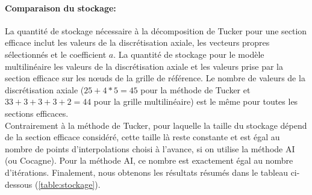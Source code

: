 \paragraph{Comparaison du stockage:\\}
\hspace{0.5cm} La quantité de stockage nécessaire à la décomposition de Tucker pour une section efficace inclut les valeurs de la discrétisation axiale, les vecteurs propres sélectionnés et le coefficient $a$. La quantité de stockage pour le modèle multilinéaire les valeurs de la discrétisation axiale et les valeurs prise par la section efficace sur les nœuds de la grille de référence. Le nombre de valeurs de la discrétisation axiale ($25+4*5=45$ pour la méthode de Tucker et $33+3+3+3+2=44$ pour la grille multilinéaire) est le même pour toutes les sections efficaces.\\
Contrairement à la méthode de Tucker, pour laquelle la taille du stockage dépend de la section efficace considéré, cette taille là reste constante et est égal au nombre de points d'interpolations choisi à l'avance, si on utilise la méthode AI (ou Cocagne). Pour la méthode AI, ce nombre est exactement égal au nombre d'itérations. Finalement, nous obtenons les résultats résumés dans le tableau ci-dessous (\ref{table:stockage}).\\

